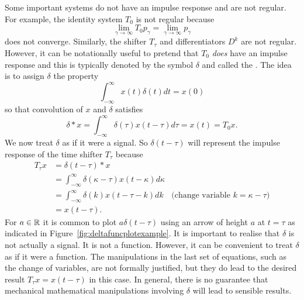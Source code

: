 Some important systems do not have an impulse response and are not regular.  For example, the identity system $T_0$ is not regular because 
\[
\lim_{\gamma \rightarrow \infty} T_0 p_\gamma = \lim_{\gamma \rightarrow \infty} p_\gamma
\]
does not converge.  %
Similarly, the  shifter $T_\tau$ and differentiators $D^k$ are not regular.  However, it can be notationally useful to pretend that $T_0$ \emph{does} have an impulse response and this is typically denoted by the symbol $\delta$ and called the .  The idea is to assign $\delta$ the property
\[
\int_{-\infty}^\infty x(t) \delta(t) dt = x(0) %
\]
so that convolution of $x$ and $\delta$ satisfies
\[
\delta * x = \int_{-\infty}^{\infty} \delta(\tau) x(t - \tau) d\tau = x(t) = T_0 x .
\]
We now treat $\delta$ as if it were a signal.  So $\delta(t - \tau)$ will represent the impulse response of the time shifter $T_\tau$ because
\begin{align*}
T_\tau x &= \delta(t - \tau) * x \\
&= \int_{-\infty}^{\infty} \delta(\kappa -\tau) x(t - \kappa) d\kappa \\
&= \int_{-\infty}^{\infty} \delta(k) x(t - \tau - k) dk & \text{(change variable $k = \kappa - \tau$)}\\
&= x(t-\tau).
\end{align*}
For $a \in {\mathbb R}$ it is common to plot $a\delta(t - \tau)$ using an arrow of height $a$ at $t = \tau$ as indicated in Figure~\ref{fig:deltafuncplotexample}.  It is important to realise that $\delta$ is not actually a signal.  It is not a function.  However, it can be convenient to treat $\delta$ as if it were a function.  The manipulations in the last set of equations, such as the change of variables, are not formally justified, but they do lead to the desired result $T_\tau x = x(t-\tau)$ in this case.  In general, there is no guarantee that mechanical mathematical manipulations involving $\delta$ will lead to sensible results.

